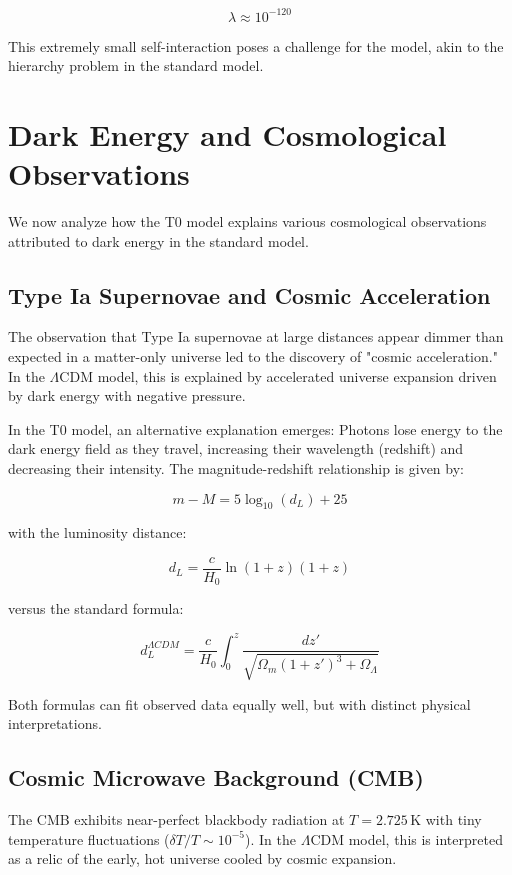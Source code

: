 \documentclass[a4paper,12pt]{article}
\theoremstyle{definition}
\theoremstyle{remark}
\begin{document}
	\begin{equation}
		\lambda \approx 10^{-120}
	\end{equation}
	
	This extremely small self-interaction poses a challenge for the model, akin to the hierarchy problem in the standard model.
	
	\section{Dark Energy and Cosmological Observations}
	We now analyze how the T0 model explains various cosmological observations attributed to dark energy in the standard model.
	
	\subsection{Type Ia Supernovae and Cosmic Acceleration}
	The observation that Type Ia supernovae at large distances appear dimmer than expected in a matter-only universe led to the discovery of "cosmic acceleration." In the $\Lambda$CDM model, this is explained by accelerated universe expansion driven by dark energy with negative pressure.
	
	In the T0 model, an alternative explanation emerges: Photons lose energy to the dark energy field as they travel, increasing their wavelength (redshift) and decreasing their intensity. The magnitude-redshift relationship is given by:
	
	\begin{equation}
		m - M = 5 \log_{10}(d_L) + 25
	\end{equation}
	
	with the luminosity distance:
	
	\begin{equation}
		d_L = \frac{c}{H_0} \ln(1+z) (1+z)
	\end{equation}
	
	versus the standard formula:
	
	\begin{equation}
		d_L^{\Lambda CDM} = \frac{c}{H_0} \int_0^z \frac{dz'}{\sqrt{\Omega_m(1+z')^3 + \Omega_\Lambda}}
	\end{equation}
	
	Both formulas can fit observed data equally well, but with distinct physical interpretations.
	
	\subsection{Cosmic Microwave Background (CMB)}
	The CMB exhibits near-perfect blackbody radiation at $T = 2.725 \, \text{K}$ with tiny temperature fluctuations ($\delta T/T \sim 10^{-5}$). In the $\Lambda$CDM model, this is interpreted as a relic of the early, hot universe cooled by cosmic expansion.
	
\end{document}

